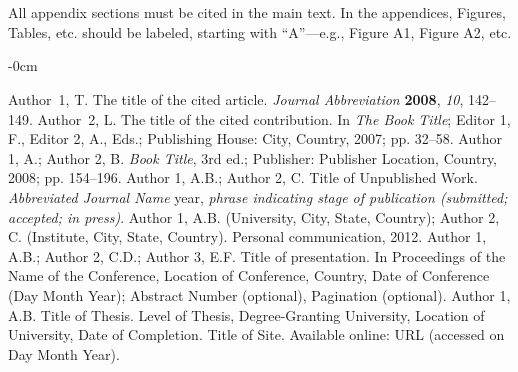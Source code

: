 \documentclass[journal,article,submit,pdftex,moreauthors]{Definitions/mdpi}
\begin{document}
\section[\appendixname~\thesection]{}
All appendix sections must be cited in the main text. In the appendices, Figures, Tables, etc. should be labeled, starting with ``A''---e.g., Figure A1, Figure A2, etc.

\begin{adjustwidth}{-\extralength}{0cm}



%

\begin{thebibliography}{999}
Author~1, T. The title of the cited article. {\em Journal Abbreviation} {\bf 2008}, {\em 10}, 142--149.
Author~2, L. The title of the cited contribution. In {\em The Book Title}; Editor 1, F., Editor 2, A., Eds.; Publishing House: City, Country, 2007; pp. 32--58.
Author 1, A.; Author 2, B. \textit{Book Title}, 3rd ed.; Publisher: Publisher Location, Country, 2008; pp. 154--196.
Author 1, A.B.; Author 2, C. Title of Unpublished Work. \textit{Abbreviated Journal Name} year, \textit{phrase indicating stage of publication (submitted; accepted; in press)}.
Author 1, A.B. (University, City, State, Country); Author 2, C. (Institute, City, State, Country). Personal communication, 2012.
Author 1, A.B.; Author 2, C.D.; Author 3, E.F. Title of presentation. In Proceedings of the Name of the Conference, Location of Conference, Country, Date of Conference (Day Month Year); Abstract Number (optional), Pagination (optional).
Author 1, A.B. Title of Thesis. Level of Thesis, Degree-Granting University, Location of University, Date of Completion.
Title of Site. Available online: URL (accessed on Day Month Year).
\end{thebibliography}


\end{adjustwidth}
\end{document}
